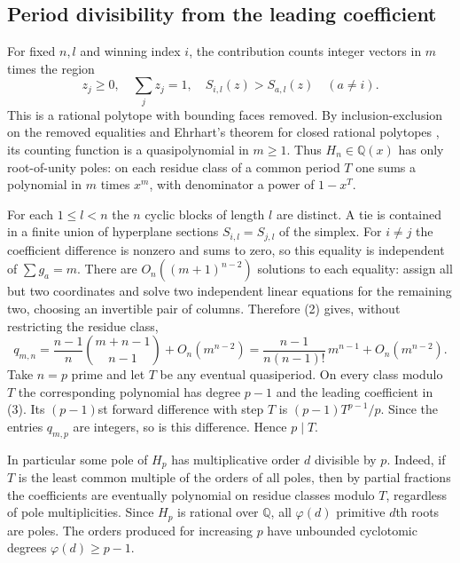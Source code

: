\documentclass[11pt,a4paper]{article}
\numberwithin{equation}{section}
\theoremstyle{definition}
\theoremstyle{remark}
\begin{document}
\subsection*{Period divisibility from the leading coefficient}
For fixed $n,l$ and winning index $i$, the contribution counts integer
vectors in $m$ times the region
\[
 z_j\ge0,\quad \sum_j z_j=1,\quad
 S_{i,l}(z)>S_{a,l}(z)\quad(a\ne i).
\]
This is a rational polytope with bounding faces removed. By
inclusion-exclusion on the removed equalities and Ehrhart's theorem
for closed rational polytopes \cite{r42taisho:BR}, its counting function is a
quasipolynomial in $m\ge1$. Thus $H_n\in\mathbb Q(x)$ has only
root-of-unity poles: on each residue class of a common period $T$
one sums a polynomial in $m$ times $x^m$, with denominator a power
of $1-x^T$.

For each $1\le l<n$ the $n$ cyclic blocks of length $l$ are distinct.
A tie is contained in a finite union of hyperplane sections
$S_{i,l}=S_{j,l}$ of the simplex. For $i\ne j$
the coefficient difference is nonzero and sums to zero, so this
equality is independent of $\sum g_a=m$. There are
$O_n((m+1)^{n-2})$ solutions to each equality: assign all but two
coordinates and solve two independent linear equations for the
remaining two, choosing an invertible pair of columns. Therefore
(2) gives, without restricting the residue class,
\[
 q_{m,n}=\frac{n-1}{n}\binom{m+n-1}{n-1}+O_n(m^{n-2})
 =\frac{n-1}{n(n-1)!}\,m^{n-1}+O_n(m^{n-2}).
 \tag{3}
\]
Take $n=p$ prime and let $T$ be any eventual quasiperiod. On every
class modulo $T$ the corresponding polynomial has degree $p-1$
and the leading coefficient in (3). Its $(p-1)$st forward difference
with step $T$ is $(p-1)T^{p-1}/p$. Since the entries $q_{m,p}$ are
integers, so is this difference. Hence $p\mid T$.

In particular some pole of $H_p$ has multiplicative order $d$
divisible by $p$. Indeed, if $T$ is the least common multiple
of the orders of all poles, then by partial fractions the coefficients
are eventually polynomial on residue classes modulo $T$, regardless
of pole multiplicities. Since $H_p$ is rational over $\mathbb Q$,
all $\varphi(d)$ primitive $d$th roots are poles.
The orders produced for increasing $p$ have unbounded cyclotomic
degrees $\varphi(d)\ge p-1$.
\end{document}

